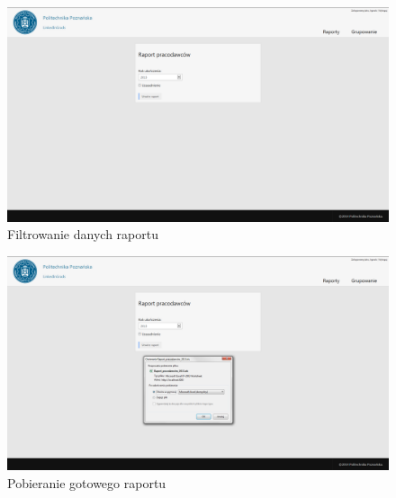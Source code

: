 \begin{figure}[H] 
\centering\includegraphics[width=15cm]{figures/image17}
\caption{Filtrowanie danych raportu}\label{rys:use-case-diagram}
\end{figure}

\begin{figure}[H] 
\centering\includegraphics[width=15cm]{figures/image18}
\caption{Pobieranie gotowego raportu}\label{rys:use-case-diagram}
\end{figure}
